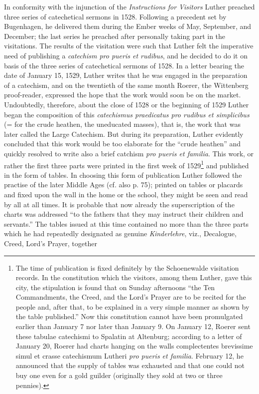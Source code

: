 In conformity with the injunction of the \emph{Instructions for Visitors} Luther preached three series of catechetical sermons in 1528. Following a precedent set by Bugenhagen, he delivered them during the Ember weeks of May, September, and December; the last series he preached after personally taking part in the visitations. The results of the visitation were such that Luther felt the imperative need of publishing a \emph{catechism pro pueris et rudibus}, and he decided to do it on basis of the three series of catechetical
sermons of 1528. In a letter bearing the date of January 15, 1529, Luther writes that he was engaged in the preparation of a catechism, and on the twentieth of the same month Roerer, the Wittenberg proof-reader, expressed the hope that the work would soon be on the market. Undoubtedly, therefore, about the close of 1528 or the beginning of 1529 Luther began the composition of this \emph{catechismus praedicatus pro rudibus et simplicibus} (= for the crude heathen, the uneducated masses), that is, the work that was later called the Large Catechism. But during its preparation, Luther evidently concluded that this work would be too elaborate for the “crude heathen” and quickly resolved to write also a brief catchism \emph{pro pueris et familia}. This work, or rather the first three parts were printed in the first week of 1529\footnote{The time of publication is fixed definitely by the Schoenewalde visitation records. In the constitution which the visitors, among them Luther, gave this city, the stipulation is found that on Sunday afternoons “the Ten Commandments, the Creed, and the Lord’s Prayer are to be recited for the people and, after that, to be explained in a very simple manner as shown by the table published.” Now this constitution cannot have been promulgated earlier than January 7 nor later than January 9. On January 12, Roerer sent these tabulae catechismi to Spalatin at Altenburg; according to a letter of January 20, Roerer had charts hanging on the walls complectentes brevissime simul et crasse catechismum Lutheri \emph{pro pueris et familia}. February 12, he announced that the supply of tables was exhausted and that one could not buy one even for a gold guilder (originally they sold at two or three pennies).} and published in the form of tables. In choosing this form of publication Luther followed the practise of the later Middle Ages (cf. also p. 75); printed on tables or placards and fixed upon the wall in the home or the school, they might be seen and read by all at all times. It is probable that now already the superscription of the charts was addressed “to the fathers that they may instruct their children and servants.” The tables issued at this time contained no more than the three parts which he had repeatedly designated as genuine \emph{Kinderlehre}, viz., Decalogue, Creed, Lord’s Prayer, together
